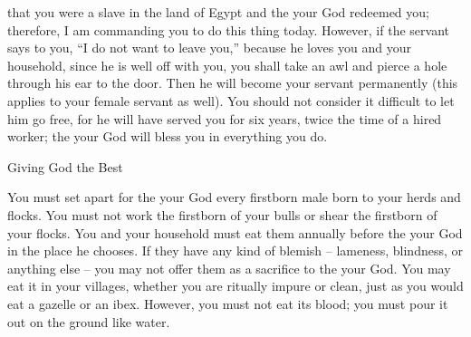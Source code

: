 {that
you were a slave
in the land
of Egypt
and the
{}
your God
redeemed
you; therefore,
I am
commanding
you to do this
thing
today.
However, if
the servant says
to
you, “I do not
want to leave
you,”
because
he loves
you and your household,
since
he is well
off with you,
you shall take
an awl
and pierce a hole
through his ear
to the door.
Then he will become
your servant
permanently
(this
applies
to your female servant as well).
You should not
consider
it difficult
to let him go
free,
for
he will have served
you for six
years,
twice
the time of a hired
worker;
the {}
your God
will bless
you in everything
you do.
\par }{\SH Giving God the Best
\par }{\PP {}You must set apart
for the
{}
your God
every
firstborn
male
born
to your herds
and flocks.
You must not
work
the firstborn
of your bulls
or
shear
the firstborn
of your flocks.
You
and your household
must eat
them annually
before
the {}
your God
in the place
he chooses.
If
they have any kind of blemish
– lameness,
blindness,
or
anything else –
you may not
offer
them as a sacrifice
to the
{}
your God.
You may eat
it in your villages,
whether you are ritually impure
or clean,
just as you would eat a gazelle
or an ibex.
However,
you must not
eat
its blood;
you must pour
it out on
the ground
like water.

}
